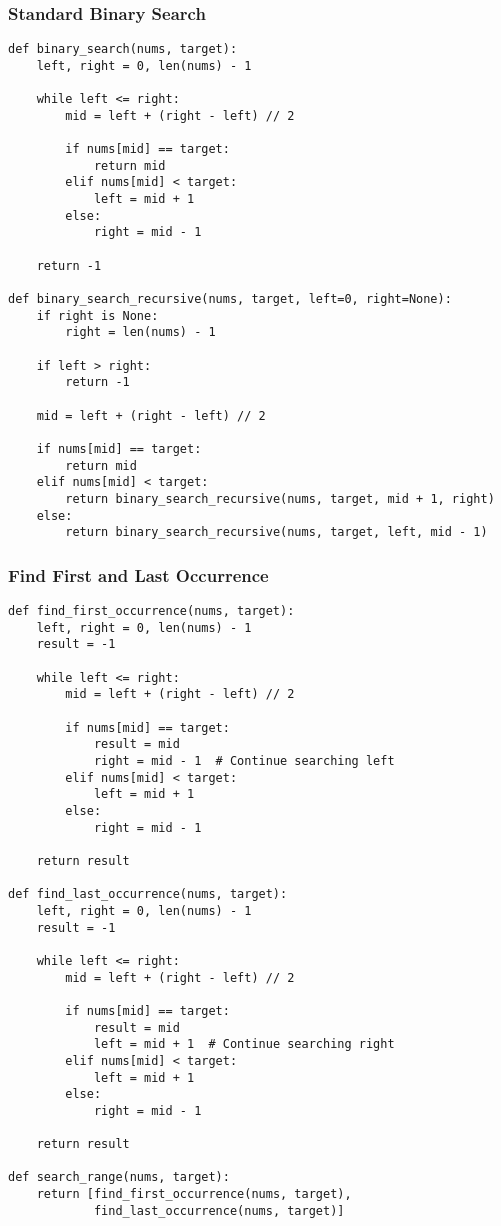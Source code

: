 \documentclass[10pt,a4paper]{article}
\begin{document}
\subsubsection{Standard Binary Search}
\begin{lstlisting}
def binary_search(nums, target):
    left, right = 0, len(nums) - 1

    while left <= right:
        mid = left + (right - left) // 2

        if nums[mid] == target:
            return mid
        elif nums[mid] < target:
            left = mid + 1
        else:
            right = mid - 1

    return -1

def binary_search_recursive(nums, target, left=0, right=None):
    if right is None:
        right = len(nums) - 1

    if left > right:
        return -1

    mid = left + (right - left) // 2

    if nums[mid] == target:
        return mid
    elif nums[mid] < target:
        return binary_search_recursive(nums, target, mid + 1, right)
    else:
        return binary_search_recursive(nums, target, left, mid - 1)
\end{lstlisting}

\subsubsection{Find First and Last Occurrence}
\begin{lstlisting}
def find_first_occurrence(nums, target):
    left, right = 0, len(nums) - 1
    result = -1

    while left <= right:
        mid = left + (right - left) // 2

        if nums[mid] == target:
            result = mid
            right = mid - 1  # Continue searching left
        elif nums[mid] < target:
            left = mid + 1
        else:
            right = mid - 1

    return result

def find_last_occurrence(nums, target):
    left, right = 0, len(nums) - 1
    result = -1

    while left <= right:
        mid = left + (right - left) // 2

        if nums[mid] == target:
            result = mid
            left = mid + 1  # Continue searching right
        elif nums[mid] < target:
            left = mid + 1
        else:
            right = mid - 1

    return result

def search_range(nums, target):
    return [find_first_occurrence(nums, target),
            find_last_occurrence(nums, target)]
\end{lstlisting}
\end{document}

